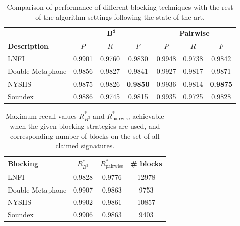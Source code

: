 \documentclass{pracamgr}
\begin{document}
\begin{table}[H]
\caption{Comparison of performance of different blocking techniques with
the rest of the algorithm settings following the state-of-the-art.}
\centering
\begin{tabular}{|l|c c c | c c c|}
  \hline
                       & \multicolumn{3}{c|}{$\mathbf{B^{3}}$} & \multicolumn{3}{c|}{\textbf{Pairwise}}\\
  \textbf{Description} & $P$ & $R$ & $F$ & $P$ & $R$ & $F$ \\
  \hline
\hline
LNFI & 0.9901 & 0.9760 & 0.9830  & 0.9948 & 0.9738 & 0.9842\\
Double Metaphone & 0.9856 & 0.9827 & 0.9841  & 0.9927 & 0.9817 & 0.9871 \\
NYSIIS & 0.9875 & 0.9826 & \textbf{0.9850}  & 0.9936 & 0.9814 & \textbf{0.9875} \\
Soundex & 0.9886 & 0.9745 & 0.9815 & 0.9935 & 0.9725 & 0.9828 \\
\hline
\end{tabular}
\label{tab:10}
\end{table}


\begin{table}[H]
\caption{Maximum recall values $R_{B^{3}}^*$ and $R_\text{pairwise}^*$ achievable when the given blocking strategies
are used, and corresponding number of blocks on the set of all claimed signatures.}
\label{table:blocking}
\centering
\begin{tabular}{|l|cc|c|}
  \hline
  \textbf{Blocking} & $R_{B^{3}}^*$ & $R_\text{pairwise}^*$ & \# blocks \\
  \hline
  \hline
    LNFI & 0.9828 & 0.9776 & 12978 \\
    Double Metaphone & 0.9907 & 0.9863 & 9753 \\
    NYSIIS & 0.9902 & 0.9861 & 10857 \\
    Soundex & 0.9906 & 0.9863 & 9403 \\
  \hline
\end{tabular}
\label{tab:11}
\end{table}
\end{document}
